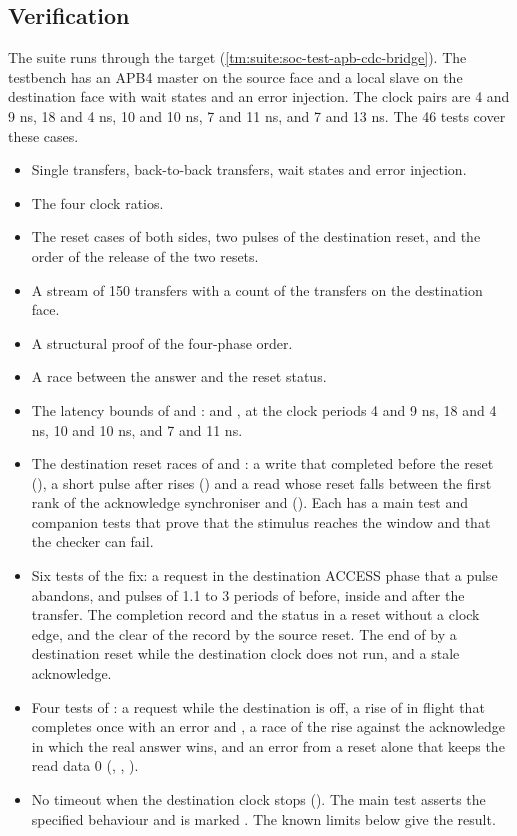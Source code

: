 \subsection{Verification}
The suite  runs through the target  (\cref{tm:suite:soc-test-apb-cdc-bridge}). The testbench has an APB4 master on the source face and a local slave on the destination face with wait states and an error injection. The clock pairs are 4 and 9 ns, 18 and 4 ns, 10 and 10 ns, 7 and 11 ns, and 7 and 13 ns. The 46 tests cover these cases.
\begin{itemize}
  \item Single transfers, back-to-back transfers, wait states and error injection.
  \item The four clock ratios.
  \item The reset cases of both sides, two pulses of the destination reset, and the order of the release of the two resets.
  \item A stream of 150 transfers with a count of the transfers on the destination face.
  \item A structural proof of the four-phase order.
  \item A race between the answer and the reset status.
  \item The latency bounds of  and :  and , at the clock periods 4 and 9 ns, 18 and 4 ns, 10 and 10 ns, and 7 and 11 ns.
  \item The destination reset races of  and : a write that completed before the reset (), a short pulse after  rises () and a read whose reset falls between the first rank of the acknowledge synchroniser and  (). Each has a main test and companion tests that prove that the stimulus reaches the window and that the checker can fail.
  \item Six tests of the fix: a request in the destination ACCESS phase that a pulse abandons, and pulses of 1.1 to 3 periods of  before, inside and after the transfer. The completion record and the status in a reset without a clock edge, and the clear of the record by the source reset. The end of  by a destination reset while the destination clock does not run, and a stale acknowledge.
  \item Four tests of : a request while the destination is off, a rise of  in flight that completes once with an error and , a race of the rise against the acknowledge in which the real answer wins, and an error from a reset alone that keeps the read data 0 (, , ).
  \item No timeout when the destination clock stops (). The main test asserts the specified behaviour and is marked . The known limits below give the result.
\end{itemize}

